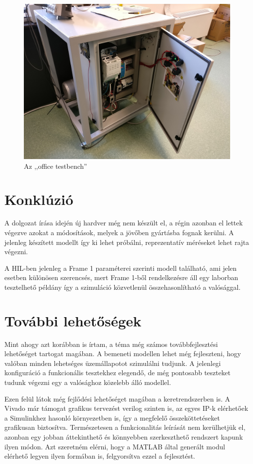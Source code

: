 \begin{figure}[H]
	\centering
	\includegraphics[width = \textwidth]{figures/office_testbench.jpg}
	\caption{Az ,,office testbench''} 
	\label{fig:office_testbench}
\end{figure}



\section{Konklúzió}

A dolgozat írása idején új hardver még nem készült el, a régin azonban el lettek végezve azokat a módosítások, melyek a jövőben gyártásba fognak kerülni. A jelenleg készített modellt így ki lehet próbálni, reprezentatív méréseket lehet rajta végezni.

A HIL-ben jelenleg a Frame 1 paraméterei szerinti modell található, ami jelen esetben különösen szerencsés, mert Frame 1-ből rendelkezésre áll egy laborban tesztelhető példány így a szimuláció közvetlenül összehasonlítható a valósággal.



\section{További lehetőségek}

Mint ahogy azt korábban is írtam, a téma még számos továbbfejlesztési lehetőséget tartogat magában. A bemeneti modellen lehet még fejleszteni, hogy valóban minden lehetséges üzemállapotot szimulálni tudjunk. A jelenlegi konfiguráció a funkcionális tesztekhez elegendő, de még pontosabb teszteket tudunk végezni egy a valósághoz közelebb álló modellel.

Ezen felül látok még fejlődési lehetőséget magában a keretrendszerben is. A Vivado már támogat grafikus tervezést verilog szinten is, az egyes IP-k elérhetőek a Simulinkhez hasonló környezetben is, így a megfelelő összeköttetéseket grafikusan biztosítva. Természetesen a funkcionalitás leírását nem kerülhetjük el, azonban egy jobban áttekinthető és könnyebben szerkeszthető rendszert kapunk ilyen módon. Azt szeretném elérni, hogy a MATLAB által generált modul elérhető legyen ilyen formában is, felgyorsítva ezzel a fejlesztést.